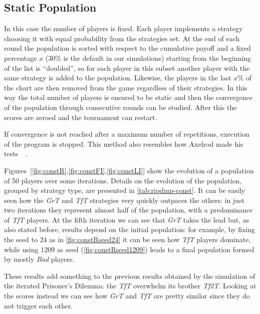 \documentclass[journal,10pt,twoside]{IEEEtran}
\begin{document}
\subsection{Static Population}
In this case the number of players is fixed. Each player implements a strategy choosing it with equal probability from the strategies set. At the end of each round the population is sorted with respect to the cumulative payoff and a fixed percentage $x$ ($30\%$ is the default in our simulations) starting from the beginning of the list is ``doubled'', so for each player in this subset another player with the same strategy is added to the population. Likewise, the players in the last $x\%$ of the chart are then removed from the game regardless of their strategies. In this way the total number of players is ensured to be static and then the convergence of the population through consecutive rounds can be studied. After this the scores are zeroed and the tournament can restart.

If convergence is not reached after a maximum number of repetitions, execution of the program is stopped.
This method also resembles how Axelrod made his tests~\cite[\S 2.6]{mathieu2017}~\cite{axelrod1984evolution}.

Figures~[\ref{fig:constR},\ref{fig:constFI},\ref{fig:constLI}] show the evolution of a population of 50 players over some iterations.
Details on the evolution of the population, grouped by strategy type, are presented in \autoref{tab:ripdmp-const}.
It can be easily seen how the \textit{GrT} and \textit{TfT} strategies very quickly outpaces the others: in just two iterations they represent almost half of the population, with a predominance of \textit{TfT} players. At the fifth iteration we can see that \textit{GrT} takes the lead but, as also stated before, results depend on the initial population: for example, by fixing the seed to $24$ as in \autoref{fig:constRseed24} it can be seen how \textit{TfT} players dominate, while using $1209$ as seed (\autoref{fig:constRseed1209}) leads to a final population formed by mostly \textit{Bad} players.

These results add something to the previous results obtained by the simulation of the iterated Prisoner's Dilemma: the \textit{TfT} overwhelm its brother \textit{Tf2T}. Looking at the scores instead we can see how \textit{GrT} and \textit{TfT} are pretty similar since they do not trigger each other.
\end{document}

